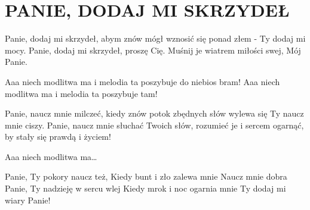 \documentclass[../../../songbook.tex]{subfiles}
\begin{document}
\TabPositions{8cm} %
\section*{PANIE, DODAJ MI SKRZYDEŁ}
\vspace{0.5cm}
Panie, dodaj mi skrzydeł, abym znów			 \newline
mógł wznosić się ponad złem - Ty dodaj mi mocy.	 \newline
Panie, dodaj mi skrzydeł, proszę Cię.			 \newline
Muśnij je wiatrem miłości swej, Mój Panie.		 \newline

\-\hspace{1cm} Aaa niech modlitwa ma				 \newline	
\-\hspace{1cm} i melodia ta poszybuje do niebios bram!		 \newline
\-\hspace{1cm} Aaa niech modlitwa ma 				 \newline
\-\hspace{1cm} i melodia ta poszybuje tam!				 \newline

Panie, naucz mnie milczeć, kiedy znów				\newline
potok zbędnych słów wylewa się						\newline
Ty naucz mnie ciszy.								\newline
Panie, naucz mnie słuchać Twoich słów,				\newline
rozumieć je i sercem ogarnąć, by stały się prawdą i życiem!	\newline

\-\hspace{1cm} Aaa niech modlitwa ma…	\newline

Panie, Ty pokory naucz też,		\newline
Kiedy bunt i zło zalewa mnie	\newline
Naucz mnie dobra				\newline
Panie, Ty nadzieję w sercu wlej	\newline
Kiedy mrok i noc ogarnia mnie	\newline
Ty dodaj mi wiary Panie!		\newline
\end{document}
